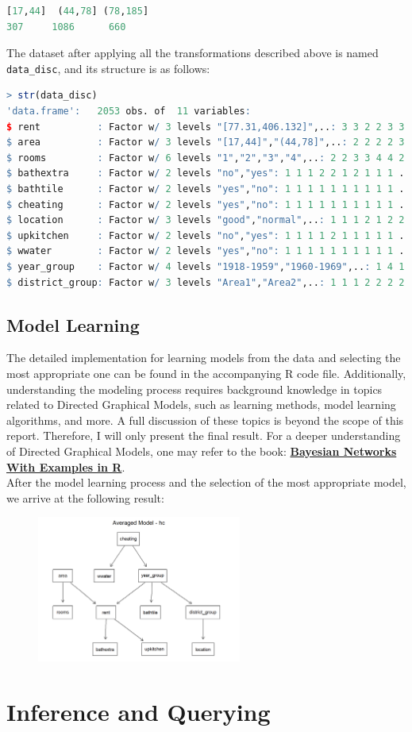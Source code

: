 \documentclass[15pt,a4paper]{report}
\begin{document}
\begin{itemize}
\begin{lstlisting}[language=R]
[17,44]  (44,78] (78,185] 
307     1086      660 
\end{lstlisting}
The dataset after applying all the transformations described above is named \lstinline[language=R]|data_disc|, and its structure is as follows:
\begin{lstlisting}[language=R]
> str(data_disc)
'data.frame':	2053 obs. of  11 variables:
$ rent          : Factor w/ 3 levels "[77.31,406.132]",..: 3 3 2 2 3 3 1 2 2 1 ...
$ area          : Factor w/ 3 levels "[17,44]","(44,78]",..: 2 2 2 2 3 3 2 3 2 2 ...
$ rooms         : Factor w/ 6 levels "1","2","3","4",..: 2 2 3 3 4 4 2 3 1 3 ...
$ bathextra     : Factor w/ 2 levels "no","yes": 1 1 1 2 2 1 2 1 1 1 ...
$ bathtile      : Factor w/ 2 levels "yes","no": 1 1 1 1 1 1 1 1 1 1 ...
$ cheating      : Factor w/ 2 levels "yes","no": 1 1 1 1 1 1 1 1 1 1 ...
$ location      : Factor w/ 3 levels "good","normal",..: 1 1 1 2 1 2 2 2 2 2 ...
$ upkitchen     : Factor w/ 2 levels "no","yes": 1 1 1 1 2 1 1 1 1 1 ...
$ wwater        : Factor w/ 2 levels "yes","no": 1 1 1 1 1 1 1 1 1 1 ...
$ year_group    : Factor w/ 4 levels "1918-1959","1960-1969",..: 1 4 1 3 4 3 1 1 1 1 ...
$ district_group: Factor w/ 3 levels "Area1","Area2",..: 1 1 1 2 2 2 2 2 2 2 ...
\end{lstlisting}
\end{itemize}
\subsection*{Model Learning}
The detailed implementation for learning models from the data and selecting the most appropriate one can be found in the accompanying R code file. Additionally, understanding the modeling process requires background knowledge in topics related to Directed Graphical Models, such as learning methods, model learning algorithms, and more. A full discussion of these topics is beyond the scope of this report. Therefore, I will only present the final result.
For a deeper understanding of Directed Graphical Models, one may refer to the book: \textbf{\href{https://www.bnlearn.com/book-crc-2ed/}{Bayesian Networks With Examples in R}}.\\

After the model learning process and the selection of the most appropriate model, we arrive at the following result:
\begin{figure}[H]
	\centering \includegraphics[width=0.6\textwidth]{unnamed-chunk-30-2.png}
\end{figure}
\section*{Inference and Querying}
\newpage
\end{document}
